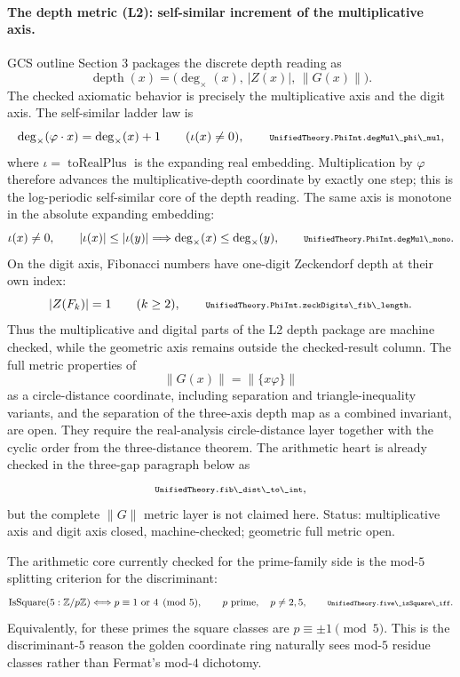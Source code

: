 \documentclass[11pt]{article}
\newcommand{\lean}[1]{\relax\ifmmode\hbox{\scriptsize\ttfamily\detokenize{#1}}\else{\small\texttt{\detokenize{#1}}}\fi}
\begin{document}
\paragraph{The depth metric (L2): self-similar increment of the multiplicative axis.}
GCS outline Section 3 packages the discrete depth reading as
$$
  \operatorname{depth}(x)=\bigl(\deg_\times(x),\,|Z(x)|,\,\|G(x)\|\bigr).
$$
The checked axiomatic behavior is precisely the multiplicative axis and the digit axis.  The self-similar ladder law is
$$
  \deg_\times(\varphi\cdot x)=\deg_\times(x)+1
  \qquad
  (\iota(x)\ne0),
  \qquad
  \lean{UnifiedTheory.PhiInt.degMul\_phi\_mul},
$$
where $\iota=\operatorname{toRealPlus}$ is the expanding real embedding.  Multiplication by $\varphi$ therefore advances the multiplicative-depth coordinate by exactly one step; this is the log-periodic self-similar core of the depth reading.  The same axis is monotone in the absolute expanding embedding:
$$
  \iota(x)\ne0,\qquad
  |\iota(x)|\le|\iota(y)|
  \Longrightarrow
  \deg_\times(x)\le\deg_\times(y),
  \qquad
  \lean{UnifiedTheory.PhiInt.degMul\_mono}.
$$
On the digit axis, Fibonacci numbers have one-digit Zeckendorf depth at their own index:
$$
  |Z(F_k)|=1
  \qquad
  (k\ge2),
  \qquad
  \lean{UnifiedTheory.PhiInt.zeckDigits\_fib\_length}.
$$
Thus the multiplicative and digital parts of the L2 depth package are machine checked, while the geometric axis remains outside the checked-result column.  The full metric properties of
$$
  \|G(x)\|=\|\{x\varphi\}\|
$$
as a circle-distance coordinate, including separation and triangle-inequality variants, and the separation of the three-axis depth map as a combined invariant, are open.  They require the real-analysis circle-distance layer together with the cyclic order from the three-distance theorem.  The arithmetic heart is already checked in the three-gap paragraph below as
$$
  \lean{UnifiedTheory.fib\_dist\_to\_int},
$$
but the complete $\|G\|$ metric layer is not claimed here.  Status: multiplicative axis and digit axis closed, machine-checked; geometric full metric open.

The arithmetic core currently checked for the prime-family side is the mod-$5$ splitting criterion for the discriminant:
$$
  \operatorname{IsSquare}(5:\mathbb Z/p\mathbb Z)
  \Longleftrightarrow
  p\equiv 1\ \hbox{or}\ 4\pmod 5,
  \qquad
  p\ \hbox{prime},\quad p\ne2,5,
  \qquad
  \lean{UnifiedTheory.five\_isSquare\_iff}.
$$
Equivalently, for these primes the square classes are $p\equiv\pm1\pmod5$.  This is the discriminant-$5$ reason the golden coordinate ring naturally sees mod-$5$ residue classes rather than Fermat's mod-$4$ dichotomy.
\end{document}
